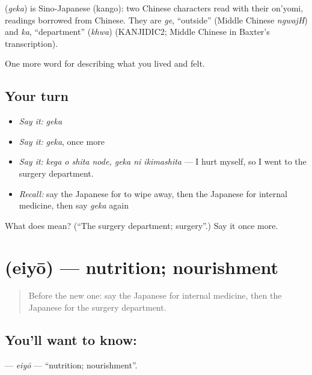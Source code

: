 \begin{cousinweb}
\textbf{} (\emph{geka}) is Sino-Japanese (kango): two Chinese characters read with their on'yomi, readings borrowed from Chinese. They are \emph{ge}, \textquotedblleft{}outside\textquotedblright{} (Middle Chinese \emph{ngwajH}) and \emph{ka}, \textquotedblleft{}department\textquotedblright{} (\emph{khwa}) (KANJIDIC2; Middle Chinese in Baxter's transcription).
\end{cousinweb}

\begin{grammarlens}[title={What you've built}]
One more word for describing what you lived and felt.
\end{grammarlens}

\subsection*{Your turn}
\begin{itemize}
\raggedright
  \item \emph{Say it:} \emph{geka}
  \item \emph{Say it:} \emph{geka}, once more
  \item \emph{Say it:} \emph{kega o shita node, geka ni ikimashita} — I hurt myself, so I went to the surgery department.
  \item \emph{Recall:} say the Japanese for to wipe away, then the Japanese for internal medicine, then say \emph{geka} again
\end{itemize}

\begin{tcolorbox}[breakable,colback=teal!4,colframe=teal!35!black,title={Before you move on}]
What does  mean? (\textquotedblleft{}The surgery department; surgery\textquotedblright{}.) Say it once more.
\end{tcolorbox}
\section[\texorpdfstring{\ja{えいよう} (eiyō)}{えいよう (eiyō)}]{ (eiyō) — nutrition; nourishment}

\label{lesson:JA-C450-eiyou}



\begin{quote}
Before the new one: say the Japanese for internal medicine, then the Japanese for the surgery department.
\end{quote}

\subsection*{You'll want to know: }
\textbf{} — \emph{eiyō} — \textquotedblleft{}nutrition; nourishment\textquotedblright{}.

